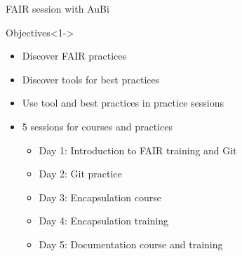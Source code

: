 \begin{frame}{FAIR session with AuBi}

\begin{block}{Objectives}<1->
\begin{itemize}
\item Discover FAIR practices
\item Discover tools for best practices
\item Use tool and best practices in practice sessions
\item 5 sessions for courses and practices
	\begin{itemize}
	\item Day 1: Introduction to FAIR training and Git
	\item Day 2: Git practice
	\item Day 3: Encapsulation course
	\item Day 4: Encapsulation training
	\item Day 5: Documentation course and training
	\end{itemize}
\end{itemize}
\end{block}
\end{frame}
